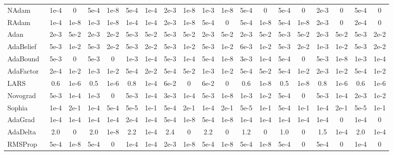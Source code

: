 \begin{table*}[ht]
{\begin{tabular}{l|cccccccccccccccccc}
\rowcolor[HTML]{D1F5FF} NAdam~\cite{iclr2018nadam} & 1e-4 & 0 & 5e-4 & 1e-8 & 5e-4 & 1e-4 & 2e-3 & 1e-8 & 1e-3 & 1e-8 & 5e-4 & 0 & 5e-4 & 0 & 2e-3 & 0 & 5e-4 & 0 \\
\rowcolor[HTML]{D1F5FF} RAdam~\cite{iclr2020radam} & 1e-4 & 1e-8 & 1e-3 & 1e-8 & 1e-4 & 1e-4 & 2e-3 & 1e-8 & 5e-4 & 0 & 5e-4 & 1e-8 & 5e-4 & 1e-8 & 2e-3 & 0 & 2e-4 & 0 \\
\rowcolor[HTML]{D1F5FF} Adan~\cite{tpami2023adan} & 2e-3 & 5e-2 & 2e-3 & 2e-2 & 5e-3 & 5e-2 & 5e-3 & 5e-2 & 2e-3 & 5e-2 & 2e-3 & 5e-2 & 5e-3 & 5e-2 & 2e-3 & 5e-2 & 5e-3 & 2e-2 \\
\rowcolor[HTML]{DCF0E2} AdaBelief~\cite{nips2019adabelief} & 5e-3 & 1e-2 & 5e-3 & 2e-2 & 5e-3 & 2e-2 & 5e-3 & 1e-2 & 5e-3 & 1e-2 & 6e-3 & 1e-2 & 5e-3 & 2e-2 & 1e-3 & 1e-2 & 5e-3 & 2e-2 \\
\rowcolor[HTML]{DCF0E2} AdaBound~\cite{iclr2019adabound} & 5e-3 & 0 & 5e-3 & 0 & 1e-3 & 1e-4 & 5e-3 & 1e-4 & 5e-4 & 1e-8 & 3e-3 & 1e-4 & 5e-4 & 0 & 5e-3 & 1e-8 & 1e-3 & 1e-4 \\
\rowcolor[HTML]{DCF0E2} AdaFactor~\cite{icml2018adafactor} & 2e-4 & 1e-2 & 1e-3 & 1e-2 & 5e-4 & 2e-2 & 5e-4 & 5e-2 & 1e-3 & 1e-2 & 5e-4 & 5e-2 & 5e-4 & 1e-2 & 2e-3 & 1e-2 & 5e-4 & 1e-2 \\
\rowcolor[HTML]{DCF0E2} LARS~\cite{iclr2018lars} & 0.6 & 1e-6 & 0.5 & 1e-6 & 0.8 & 1e-4 & 6e-2 & 0 & 6e-2 & 0 & 0.6 & 1e-8 & 0.5 & 1e-8 & 0.8 & 1e-6 & 0.6 & 1e-6 \\
\rowcolor[HTML]{DCF0E2} Novograd~\cite{arxiv2020Novograd} & 5e-3 & 1e-4 & 1e-3 & 0 & 5e-3 & 1e-4 & 3e-3 & 1e-4 & 5e-3 & 1e-8 & 1e-3 & 1e-2 & 5e-4 & 0 & 5e-3 & 1e-4 & 2e-3 & 1e-2 \\
\rowcolor[HTML]{DCF0E2} Sophia~\cite{liu2023sophia} & 1e-4 & 2e-1 & 1e-4 & 5e-4 & 5e-5 & 1e-1 & 5e-4 & 2e-1 & 1e-4 & 2e-1 & 5e-5 & 1e-1 & 5e-4 & 1e-1 & 1e-4 & 2e-1 & 5e-5 & 1e-1 \\
\rowcolor[HTML]{DBCEE4} AdaGrad~\cite{jmlr2011adagrad} & 1e-4 & 1e-4 & 1e-4 & 1e-4 & 2e-4 & 1e-4 & 5e-4 & 1e-8 & 5e-4 & 1e-8 & 1e-4 & 1e-4 & 1e-4 & 1e-4 & 1e-4 & 0 & 1e-4 & 0 \\
\rowcolor[HTML]{DBCEE4} AdaDelta~\cite{arxiv2012adadelta} & 2.0 & 0 & 2.0 & 1e-8 & 2.2 & 1e-4 & 2.4 & 0 & 2.2 & 0 & 1.2 & 0 & 1.0 & 0 & 1.5 & 1e-4 & 2.0 & 1e-4 \\
\rowcolor[HTML]{DBCEE4} RMSProp~\cite{hinton2012rmsprop} & 5e-4 & 1e-8 & 5e-4 & 0 & 1e-4 & 1e-4 & 2e-3 & 1e-8 & 5e-4 & 1e-8 & 5e-4 & 1e-8 & 5e-4 & 0 & 5e-4 & 0 & 1e-4 & 0 \\
    \bottomrule
    \end{tabular}
    }
\label{tab:app_hyper_cifar_modern}
\vspace{-0.5em}
\end{table*}
